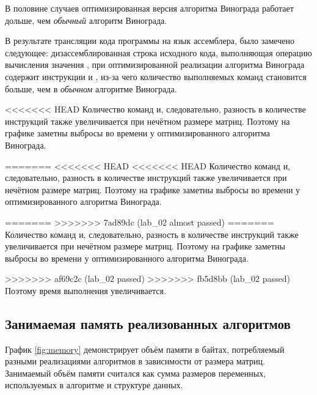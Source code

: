 В половине случаев оптимизированная версия алгоритма Винограда работает дольше, чем \textit{обычный} алгоритм Винограда.

В результате трансляции кода программы на язык ассемблера, было замечено следующее: дизассемблированная строка исходного кода, выполняющая операцию вычисления значения , при оптимизированной реализации алгоритма Винограда содержит инструкции  и , из-за чего количество выполняемых команд становится больше, чем в \textit{обычном} алгоритме Винограда.

<<<<<<< HEAD
Количество команд и, следовательно, разность в количестве инструкций также увеличивается при нечётном размере матриц.
Поэтому на графике заметны выбросы во времени у оптимизированного алгоритма Винограда.

=======
<<<<<<< HEAD
<<<<<<< HEAD
Количество команд и, следовательно, разность в количестве инструкций также увеличивается при нечётном размере матриц.
Поэтому на графике заметны выбросы во времени у оптимизированного алгоритма Винограда.

=======
>>>>>>> 7ad89dc (lab_02 almost passed)
=======
Количество команд и, следовательно, разность в количестве инструкций также увеличивается при нечётном размере матриц.
Поэтому на графике заметны выбросы во времени у оптимизированного алгоритма Винограда.

>>>>>>> af69c2c (lab_02 passed)
>>>>>>> fb5d8bb (lab_02 passed)
Поэтому время выполнения увеличивается.

\newpage

\subsection{Занимаемая память реализованных алгоритмов}
 
График \ref{fig:memory} демонстрирует объём памяти в байтах, потребляемый разными реализациями алгоритмов в зависимости от размера матриц.
Занимаемый объём памяти считался как сумма размеров переменных, используемых в алгоритме и структуре данных.

